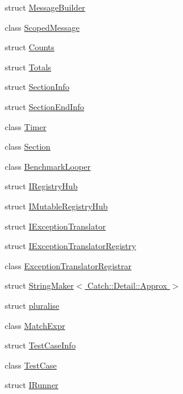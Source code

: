 \begin{DoxyCompactItemize}
struct \hyperlink{struct_catch_1_1_message_builder}{Message\-Builder}
\item 
class \hyperlink{class_catch_1_1_scoped_message}{Scoped\-Message}
\item 
struct \hyperlink{struct_catch_1_1_counts}{Counts}
\item 
struct \hyperlink{struct_catch_1_1_totals}{Totals}
\item 
struct \hyperlink{struct_catch_1_1_section_info}{Section\-Info}
\item 
struct \hyperlink{struct_catch_1_1_section_end_info}{Section\-End\-Info}
\item 
class \hyperlink{class_catch_1_1_timer}{Timer}
\item 
class \hyperlink{class_catch_1_1_section}{Section}
\item 
class \hyperlink{class_catch_1_1_benchmark_looper}{Benchmark\-Looper}
\item 
struct \hyperlink{struct_catch_1_1_i_registry_hub}{I\-Registry\-Hub}
\item 
struct \hyperlink{struct_catch_1_1_i_mutable_registry_hub}{I\-Mutable\-Registry\-Hub}
\item 
struct \hyperlink{struct_catch_1_1_i_exception_translator}{I\-Exception\-Translator}
\item 
struct \hyperlink{struct_catch_1_1_i_exception_translator_registry}{I\-Exception\-Translator\-Registry}
\item 
class \hyperlink{class_catch_1_1_exception_translator_registrar}{Exception\-Translator\-Registrar}
\item 
struct \hyperlink{struct_catch_1_1_string_maker_3_01_catch_1_1_detail_1_1_approx_01_4}{String\-Maker$<$ Catch\-::\-Detail\-::\-Approx $>$}
\item 
struct \hyperlink{struct_catch_1_1pluralise}{pluralise}
\item 
class \hyperlink{class_catch_1_1_match_expr}{Match\-Expr}
\item 
struct \hyperlink{struct_catch_1_1_test_case_info}{Test\-Case\-Info}
\item 
class \hyperlink{class_catch_1_1_test_case}{Test\-Case}
\item 
struct \hyperlink{struct_catch_1_1_i_runner}{I\-Runner}
\end{DoxyCompactItemize}
